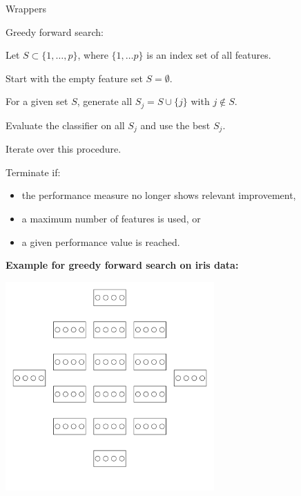 \begin{vbframe}{Wrappers}
\framebreak

\begin{blocki}{Greedy forward search:}
  \item Let $S \subset \{1, \dots, p \}$, where $\{1, \dots p \}$ is an index set of all features.
  \item Start with the empty feature set $S = \emptyset$.
  \item For a given set $S$, generate all $S_j = S \cup \{j\}$ with $j \notin S$.
  \item Evaluate the classifier on all $S_j$ and use the best $S_j$.
  \item Iterate over this procedure.
  \item Terminate if:
    \begin{itemize}
      \item the performance measure no longer shows relevant improvement,
      \item a maximum number of features is used, or
      \item a given performance value is reached.
    \end{itemize}
\end{blocki}

\framebreak

\textbf{Example for greedy forward search on iris data:}
\begin{center}
\includegraphics[width = 0.6\textwidth]{figure_man/wrapperanim1.png}
\end{center}

\framebreak


\end{vbframe}
